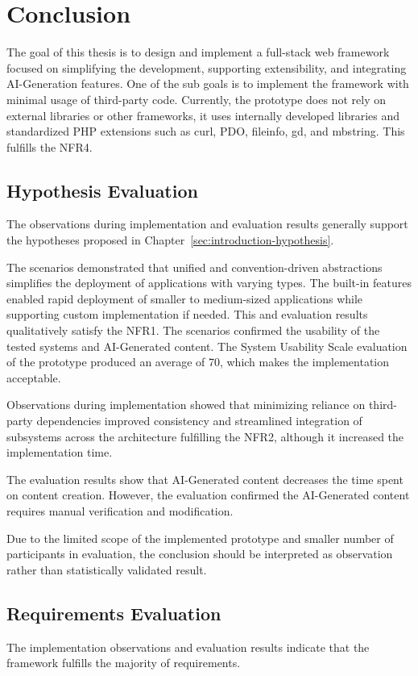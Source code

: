 \chapter{Conclusion}\label{ch:conclusion}
The goal of this thesis is to design and implement a full-stack web framework focused on simplifying the development,
supporting extensibility, and integrating AI-Generation features.
One of the sub goals is to implement the framework with minimal usage of third-party code.
Currently, the prototype does not rely on external libraries or other frameworks, it uses internally developed libraries
and standardized PHP extensions such as curl, PDO, fileinfo, gd, and mbstring.
This fulfills the NFR4.

\section*{Hypothesis Evaluation}\label{sec:hypothesis-evaluation}
The observations during implementation and evaluation results generally support the hypotheses proposed in Chapter~\ref{sec:introduction-hypothesis}.

The scenarios demonstrated that unified and convention-driven abstractions simplifies the deployment of applications with varying types.
The built-in features enabled rapid deployment of smaller to medium-sized applications while supporting custom implementation if needed.
This and evaluation results qualitatively satisfy the NFR1.
The scenarios confirmed the usability of the tested systems and AI-Generated content.
The System Usability Scale evaluation of the prototype produced an average of 70, which makes the implementation acceptable.

Observations during implementation showed that minimizing reliance on third-party dependencies improved consistency
and streamlined integration of subsystems across the architecture fulfilling the NFR2,
although it increased the implementation time.

The evaluation results show that AI-Generated content decreases the time spent on content creation.
However, the evaluation confirmed the AI-Generated content requires manual verification and modification.

Due to the limited scope of the implemented prototype and smaller number of participants in evaluation,
the conclusion should be interpreted as observation rather than statistically validated result.

\section*{Requirements Evaluation}\label{sec:requirements-evaluation}
The implementation observations and evaluation results indicate that the framework fulfills the majority of requirements.

